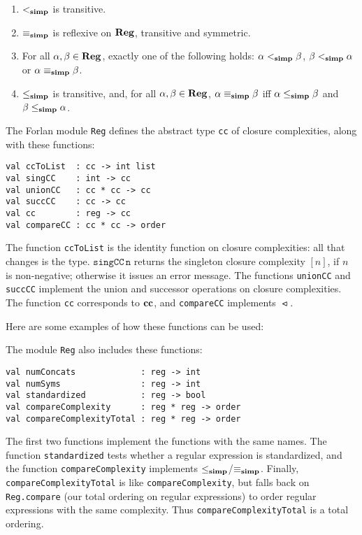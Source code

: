 \begin{proposition}
\begin{enumerate}[\quad(1)]
\item $\mathrel{<_{\mathbf{simp}}}$ is transitive.

\item $\mathrel{\equiv_{\mathbf{simp}}}$ is reflexive on $\mathbf{Reg}$, transitive and symmetric.

\item For all $\alpha,\beta\in\mathbf{Reg}$, exactly one of the following holds:
$\alpha\mathrel{<_{\mathbf{simp}}}\beta$, $\beta\mathrel{<_{\mathbf{simp}}}\alpha$ or $\alpha\mathrel{\equiv_{\mathbf{simp}}}\beta$.

\item $\mathrel{\leq_{\mathbf{simp}}}$ is transitive, and, for all $\alpha,\beta\in\mathbf{Reg}$,
$\alpha\mathrel{\equiv_{\mathbf{simp}}}\beta$ iff $\alpha\mathrel{\leq_{\mathbf{simp}}}\beta$ and $\beta\mathrel{\leq_{\mathbf{simp}}}\alpha$.
\end{enumerate}
\end{proposition}

The Forlan module \texttt{Reg} defines the abstract type \texttt{cc}
of closure complexities, along with these functions:
\begin{verbatim}
val ccToList  : cc -> int list
val singCC    : int -> cc
val unionCC   : cc * cc -> cc
val succCC    : cc -> cc
val cc        : reg -> cc
val compareCC : cc * cc -> order
\end{verbatim}
The function \texttt{ccToList} is the identity function on closure
complexities: all that changes is the type.  $\mathtt{singCC\,n}$
returns the singleton closure complexity $[n]$, if $n$ is non-negative;
otherwise it issues an error message.  The functions \texttt{unionCC}
and \texttt{succCC} implement the union and successor operations on
closure complexities.  The function \texttt{cc} corresponds to $\mathbf{cc}$, and
\texttt{compareCC} implements $\ltcc$.

Here are some examples of how these functions can be used:


The module \texttt{Reg} also includes these functions:
\begin{verbatim}
val numConcats             : reg -> int
val numSyms                : reg -> int
val standardized           : reg -> bool
val compareComplexity      : reg * reg -> order
val compareComplexityTotal : reg * reg -> order
\end{verbatim}
%
%
The first two functions implement the functions with the same names.
The function \texttt{standardized} tests whether a regular expression
is standardized, and the function \texttt{compareComplexity} implements
$\mathrel{\leq_{\mathbf{simp}}}$/$\mathrel{\equiv_{\mathbf{simp}}}$. Finally, \texttt{compareComplexityTotal} is like
\texttt{compareComplexity}, but falls back on \texttt{Reg.compare}
(our total ordering on regular expressions) to order regular expressions
with the same complexity.  Thus \texttt{compareComplexityTotal} is
a total ordering.

